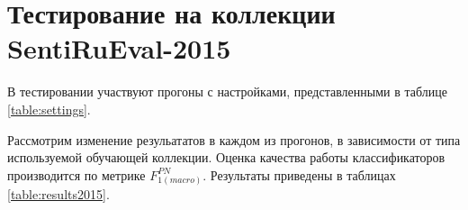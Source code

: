 \section{Тестирование на коллекции SentiRuEval-2015}

В тестировании участвуют прогоны с настройками, представленными в таблице
\ref{table:settings}.



Рассмотрим изменение резульататов в каждом из прогонов, в зависимости от
типа используемой обучающей коллекции. Оценка качества работы классификаторов
производится по метрике $F_{1(macro)}^{PN}$. Результаты приведены в таблицах
\ref{table:results2015}.




